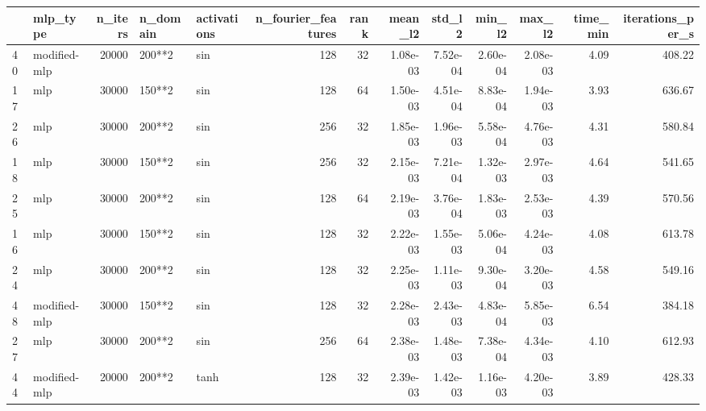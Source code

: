 \begin{tabular}{llrllrrrrrrrr}
\toprule
 & mlp_type & n_iters & n_domain & activations & n_fourier_features & rank & mean_l2 & std_l2 & min_l2 & max_l2 & time_min & iterations_per_s \\
\midrule
40 & modified-mlp & 20000 & 200**2 & sin & 128 & 32 & 1.08e-03 & 7.52e-04 & 2.60e-04 & 2.08e-03 & 4.09 & 408.22 \\
17 & mlp & 30000 & 150**2 & sin & 128 & 64 & 1.50e-03 & 4.51e-04 & 8.83e-04 & 1.94e-03 & 3.93 & 636.67 \\
26 & mlp & 30000 & 200**2 & sin & 256 & 32 & 1.85e-03 & 1.96e-03 & 5.58e-04 & 4.76e-03 & 4.31 & 580.84 \\
18 & mlp & 30000 & 150**2 & sin & 256 & 32 & 2.15e-03 & 7.21e-04 & 1.32e-03 & 2.97e-03 & 4.64 & 541.65 \\
25 & mlp & 30000 & 200**2 & sin & 128 & 64 & 2.19e-03 & 3.76e-04 & 1.83e-03 & 2.53e-03 & 4.39 & 570.56 \\
16 & mlp & 30000 & 150**2 & sin & 128 & 32 & 2.22e-03 & 1.55e-03 & 5.06e-04 & 4.24e-03 & 4.08 & 613.78 \\
24 & mlp & 30000 & 200**2 & sin & 128 & 32 & 2.25e-03 & 1.11e-03 & 9.30e-04 & 3.20e-03 & 4.58 & 549.16 \\
48 & modified-mlp & 30000 & 150**2 & sin & 128 & 32 & 2.28e-03 & 2.43e-03 & 4.83e-04 & 5.85e-03 & 6.54 & 384.18 \\
27 & mlp & 30000 & 200**2 & sin & 256 & 64 & 2.38e-03 & 1.48e-03 & 7.38e-04 & 4.34e-03 & 4.10 & 612.93 \\
44 & modified-mlp & 20000 & 200**2 & tanh & 128 & 32 & 2.39e-03 & 1.42e-03 & 1.16e-03 & 4.20e-03 & 3.89 & 428.33 \\
\bottomrule
\end{tabular}
